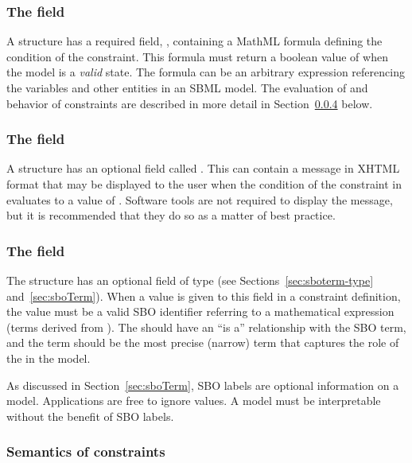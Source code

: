 \subsubsection{The  field}

A \Constraint structure has a required field, ,
containing a MathML formula defining the condition of the
constraint.  This formula must return a boolean value of
 when the model is a \emph{valid} state.  The formula
can be an arbitrary expression referencing the variables and other
entities in an SBML model.  The evaluation of  and
behavior of constraints are described in more detail in
Section~\ref{sec:constraint-semantics} below.


\subsubsection{The  field}
\label{sec:constraint-message}

A \Constraint structure has an optional field called
.  This can contain a message in XHTML format that
may be displayed to the user when the condition of the constraint
in  evaluates to a value of .  Software
tools are not required to display the message, but it is
recommended that they do so as a matter of best practice.


\subsubsection{The  field}
\label{sec:constraint-sboterm}

The \Constraint structure has an optional  field of
type  (see Sections~\ref{sec:sboterm-type}
and~\ref{sec:sboTerm}).  When a value is given to this field in a
constraint definition, the value must be a valid SBO identifier
referring to a mathematical expression (\ie terms derived from
\sbomathformula).  The \Constraint should have an ``is a''
relationship with the SBO term, and the term should be the most
precise (narrow) term that captures the role of the \Constraint in
the model.

As discussed in Section~\ref{sec:sboTerm}, SBO labels are optional
information on a model.  Applications are free to ignore
 values.  A model must be interpretable without the
benefit of SBO labels.


\subsubsection{Semantics of constraints}
\label{sec:constraint-semantics}

